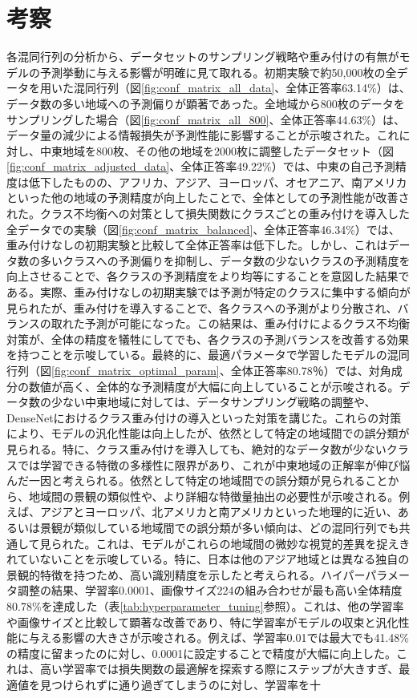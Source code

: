 \documentclass[a4paper, 11pt, titlepage]{jsarticle}
\begin{document}
\section{考察}各混同行列の分析から、データセットのサンプリング戦略や重み付けの有無がモデルの予測挙動に与える影響が明確に見て取れる。初期実験で約50,000枚の全データを用いた混同行列（図\ref{fig:conf_matrix_all_data}、全体正答率63.14\%）は、データ数の多い地域への予測偏りが顕著であった。全地域から800枚のデータをサンプリングした場合（図\ref{fig:conf_matrix_all_800}、全体正答率44.63\%）は、データ量の減少による情報損失が予測性能に影響することが示唆された。これに対し、中東地域を800枚、その他の地域を2000枚に調整したデータセット（図\ref{fig:conf_matrix_adjusted_data}、全体正答率49.22\%）では、中東の自己予測精度は低下したものの、アフリカ、アジア、ヨーロッパ、オセアニア、南アメリカといった他の地域の予測精度が向上したことで、全体としての予測性能が改善された。クラス不均衡への対策として損失関数にクラスごとの重み付けを導入した全データでの実験（図\ref{fig:conf_matrix_balanced}、全体正答率46.34\%）では、重み付けなしの初期実験と比較して全体正答率は低下した。しかし、これはデータ数の多いクラスへの予測偏りを抑制し、データ数の少ないクラスの予測精度を向上させることで、各クラスの予測精度をより均等にすることを意図した結果である。実際、重み付けなしの初期実験では予測が特定のクラスに集中する傾向が見られたが、重み付けを導入することで、各クラスへの予測がより分散され、バランスの取れた予測が可能になった。この結果は、重み付けによるクラス不均衡対策が、全体の精度を犠牲にしてでも、各クラスの予測バランスを改善する効果を持つことを示唆している。最終的に、最適パラメータで学習したモデルの混同行列（図\ref{fig:conf_matrix_optimal_param}、全体正答率80.78％）では、対角成分の数値が高く、全体的な予測精度が大幅に向上していることが示唆される。データ数の少ない中東地域に対しては、データサンプリング戦略の調整や、DenseNetにおけるクラス重み付けの導入といった対策を講じた。これらの対策により、モデルの汎化性能は向上したが、依然として特定の地域間での誤分類が見られる。特に、クラス重み付けを導入しても、絶対的なデータ数が少ないクラスでは学習できる特徴の多様性に限界があり、これが中東地域の正解率が伸び悩んだ一因と考えられる。依然として特定の地域間での誤分類が見られることから、地域間の景観の類似性や、より詳細な特徴量抽出の必要性が示唆される。例えば、アジアとヨーロッパ、北アメリカと南アメリカといった地理的に近い、あるいは景観が類似している地域間での誤分類が多い傾向は、どの混同行列でも共通して見られた。これは、モデルがこれらの地域間の微妙な視覚的差異を捉えきれていないことを示唆している。特に、日本は他のアジア地域とは異なる独自の景観的特徴を持つため、高い識別精度を示したと考えられる。ハイパーパラメータ調整の結果、学習率0.0001、画像サイズ224の組み合わせが最も高い全体精度80.78\%を達成した（表\ref{tab:hyperparameter_tuning}参照）。これは、他の学習率や画像サイズと比較して顕著な改善であり、特に学習率がモデルの収束と汎化性能に与える影響の大きさが示唆される。例えば、学習率0.01では最大でも41.48\%の精度に留まったのに対し、0.0001に設定することで精度が大幅に向上した。これは、高い学習率では損失関数の最適解を探索する際にステップが大きすぎ、最適値を見つけられずに通り過ぎてしまうのに対し、学習率を十
\end{document}
